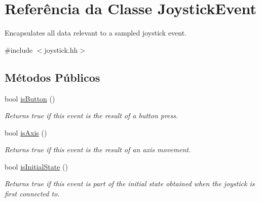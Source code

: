\hypertarget{classJoystickEvent}{}\section{Referência da Classe Joystick\+Event}
\label{classJoystickEvent}


Encapsulates all data relevant to a sampled joystick event.  




{\ttfamily \#include $<$joystick.\+hh$>$}

\subsection*{Métodos Públicos}
\begin{DoxyCompactItemize}
\item 
bool \hyperlink{classJoystickEvent_aae34d965daafe3e45a0bbfd733866386}{is\+Button} ()\hypertarget{classJoystickEvent_aae34d965daafe3e45a0bbfd733866386}{}\label{classJoystickEvent_aae34d965daafe3e45a0bbfd733866386}

\begin{DoxyCompactList}\small\item\em Returns true if this event is the result of a button press. \end{DoxyCompactList}\item 
bool \hyperlink{classJoystickEvent_a0b82c33e3a562798595138bcffe02d6a}{is\+Axis} ()\hypertarget{classJoystickEvent_a0b82c33e3a562798595138bcffe02d6a}{}\label{classJoystickEvent_a0b82c33e3a562798595138bcffe02d6a}

\begin{DoxyCompactList}\small\item\em Returns true if this event is the result of an axis movement. \end{DoxyCompactList}\item 
bool \hyperlink{classJoystickEvent_a33df9d4e8ffc2a83e96fda2010a5d7ca}{is\+Initial\+State} ()\hypertarget{classJoystickEvent_a33df9d4e8ffc2a83e96fda2010a5d7ca}{}\label{classJoystickEvent_a33df9d4e8ffc2a83e96fda2010a5d7ca}

\begin{DoxyCompactList}\small\item\em Returns true if this event is part of the initial state obtained when the joystick is first connected to. \end{DoxyCompactList}\end{DoxyCompactItemize}
